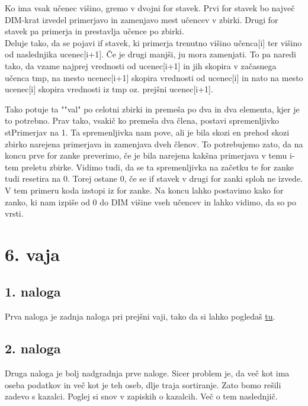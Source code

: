 \documentclass[a4paper, 12pt]{article}
\begin{document}
Ko ima vsak učenec višino, gremo v dvojni for stavek. Prvi for stavek bo največ DIM-krat izvedel primerjavo in zamenjavo mest učencev v zbirki. Drugi for stavek pa primerja in prestavlja učence po zbirki.\\
Deluje tako, da se pojavi if stavek, ki primerja trenutno višino učenca[i] ter višino od naslednjika ucenec[i+1]. Če je drugi manjši, ju mora zamenjati. To pa naredi tako, da vzame najprej vrednosti od ucenec[i+1] in jih skopira v začasnega učenca tmp, na mesto ucenec[i+1] skopira vrednosti od ucenec[i] in nato na mesto ucenec[i] skopira vrednosti iz tmp oz. prejšni ucenec[i+1].\

Tako potuje ta ""val" po celotni zbirki in premeša po dva in dva elementa, kjer je to potrebno. Prav tako, vsakič ko premeša dva člena, postavi spremenljivko stPrimerjav na 1. Ta spremenljivka nam pove, ali je bila skozi en prehod skozi zbirko narejena primerjava in zamenjava dveh členov. To potrebujemo zato, da na koncu prve for zanke preverimo, če je bila narejena kakšna primerjava v temu i-tem preletu zbirke. Vidimo tudi, da se ta spremenljivka na začetku te for zanke tudi resetira na 0. Torej ostane 0, če se if stavek v drugi for zanki sploh ne izvede. V tem primeru koda izstopi iz for zanke. Na koncu lahko postavimo kako for zanko, ki nam izpiše od 0 do DIM višine vseh učencev in lahko vidimo, da so po vrsti.

\section*{6. vaja}

\subsection*{1. naloga}

Prva naloga je zadnja naloga pri prejšni vaji, tako da si lahko pogledaš \hyperref[sec:5.3]{tu}.

\subsection*{2. naloga}

Druga naloga je bolj nadgradnja prve naloge. Sicer problem je, da več kot ima oseba podatkov in več kot je teh oseb, dlje traja sortiranje. Zato bomo rešili zadevo s kazalci. Poglej si snov v zapiskih o kazalcih. Več o tem naslednjič.

\end{document}
